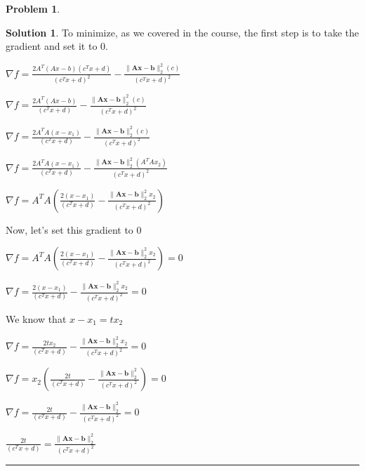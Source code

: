 \documentclass{article}
\theoremstyle{definition}
\newtheorem{problem}{Problem}
\def\fline{\rule{0.75\linewidth}{0.5pt}}
\newcommand{\finishline}{\begin{center}\fline\end{center}}
\newtheorem*{solution*}{Solution}
\newenvironment{solution}{\begin{solution*}}{{\finishline} \end{solution*}}
\begin{document}
\begin{problem}
\begin{enumerate}
    \begin{solution}
        To minimize, as we covered in the course, the first step is to take the gradient and set it to 0. \newline 

        $\nabla f = \frac{2A^T (Ax - b)(c^Tx + d)}{(c^Tx + d) ^ 2} - \frac{\|\mathbf{Ax - b}\|^2_2 (c)}{(c^Tx + d) ^ 2}$ \newline 

        $\nabla f = \frac{2A^T (Ax - b)}{(c^Tx + d)} - \frac{\|\mathbf{Ax - b}\|^2_2 (c)}{(c^Tx + d) ^ 2}$ \newline 

        $\nabla f = \frac{2A^T A (x - x_1)}{(c^Tx + d)} - \frac{\|\mathbf{Ax - b}\|^2_2 (c)}{(c^Tx + d) ^ 2}$ \newline 

        $\nabla f = \frac{2A^T A (x - x_1)}{(c^Tx + d)} - \frac{\|\mathbf{Ax - b}\|^2_2 (A^T A x_2)}{(c^Tx + d) ^ 2}$ \newline 

        $\nabla f = A^T A (\frac{2 (x - x_1)}{(c^Tx + d)} - \frac{\|\mathbf{Ax - b}\|^2_2 x_2}{(c^Tx + d) ^ 2})$ \newline 

        Now, let's set this gradient to 0 \newline 

        $\nabla f = A^T A (\frac{2 (x - x_1)}{(c^Tx + d)} - \frac{\|\mathbf{Ax - b}\|^2_2 x_2}{(c^Tx + d) ^ 2}) = 0$ \newline 

        $\nabla f = \frac{2 (x - x_1)}{(c^Tx + d)} - \frac{\|\mathbf{Ax - b}\|^2_2 x_2}{(c^Tx + d) ^ 2} = 0$ \newline 

        We know that $x - x_1 = tx_2$ \newline 

        $\nabla f = \frac{2 tx_2}{(c^Tx + d)} - \frac{\|\mathbf{Ax - b}\|^2_2 x_2}{(c^Tx + d) ^ 2} = 0$ \newline 

         $\nabla f = x_2 (\frac{2 t}{(c^Tx + d)} - \frac{\|\mathbf{Ax - b}\|^2_2 }{(c^Tx + d) ^ 2}) = 0$ \newline 

         $\nabla f = \frac{2 t}{(c^Tx + d)} - \frac{\|\mathbf{Ax - b}\|^2_2 }{(c^Tx + d) ^ 2} = 0$ \newline 

         $\frac{2 t}{(c^Tx + d)}  = \frac{\|\mathbf{Ax - b}\|^2_2 }{(c^Tx + d) ^ 2}$ \newline 


\end{solution}
\end{enumerate}
\end{problem}
\end{document}
